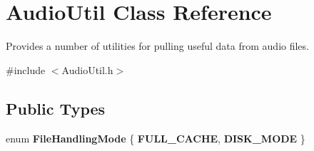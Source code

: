 \hypertarget{classAudioUtil}{
\section{AudioUtil Class Reference}
\label{classAudioUtil}
}


Provides a number of utilities for pulling useful data from audio files.  


{\ttfamily \#include $<$AudioUtil.h$>$}\subsection*{Public Types}
\begin{DoxyCompactItemize}
\item 
enum {\bfseries FileHandlingMode} \{ {\bfseries FULL\_\-CACHE}, 
{\bfseries DISK\_\-MODE}
 \}
\end{DoxyCompactItemize}
